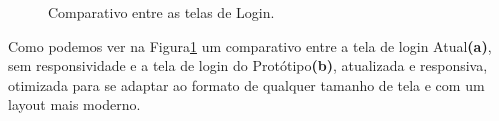 \documentclass[12pt]{article}
\begin{document}
\begin{figure}[!htb]
  \caption{Comparativo entre as telas de Login.}
  \label{figura14}
\end{figure}

Como podemos ver na Figura\ref{figura14} um comparativo entre a tela de login Atual\textbf{(a)}, sem responsividade e a tela de login do Protótipo\textbf{(b)}, atualizada e responsiva, otimizada para se adaptar ao formato de qualquer tamanho de tela e com um layout mais moderno.
\end{document}
